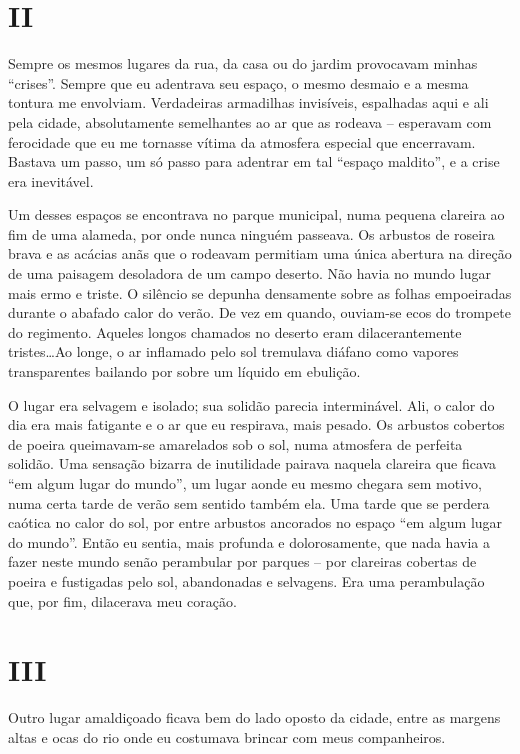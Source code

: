 \chapter*{\centering\Large{II}}

Sempre os mesmos lugares da rua, da casa ou do jardim provocavam minhas ``crises''. Sempre que eu adentrava seu espaço, o mesmo desmaio e a mesma tontura me envolviam. Verdadeiras armadilhas invisíveis, espalhadas aqui e ali pela cidade, absolutamente semelhantes ao ar que as rodeava -- esperavam com ferocidade que eu me tornasse vítima da atmosfera especial que encerravam. Bastava um passo, um só passo para adentrar em tal ``espaço maldito'', e a crise era inevitável.

Um desses espaços se encontrava no parque municipal, numa pequena clareira ao fim de uma alameda, por onde nunca ninguém passeava. Os arbustos de roseira brava e as acácias anãs que o rodeavam permitiam uma única abertura na direção de uma paisagem desoladora de um campo deserto. Não havia no mundo lugar mais ermo e triste. O silêncio se depunha densamente sobre as folhas empoeiradas durante o abafado calor do verão. De vez em quando, ouviam-se ecos do trompete do regimento. Aqueles longos chamados no deserto eram dilacerantemente tristes\dots Ao longe, o ar inflamado pelo sol tremulava diáfano como vapores transparentes bailando por sobre um líquido em ebulição.

O lugar era selvagem e isolado; sua solidão parecia interminável. Ali, o calor do dia era mais fatigante e o ar que eu respirava, mais pesado. Os arbustos cobertos de poeira queimavam-se amarelados sob o sol, numa atmosfera de perfeita solidão. Uma sensação bizarra de inutilidade pairava naquela clareira que ficava ``em algum lugar do mundo'', um lugar aonde eu mesmo chegara sem motivo, numa certa tarde de verão sem sentido também ela. Uma tarde que se perdera caótica no calor do sol, por entre arbustos ancorados no espaço ``em algum lugar do mundo''. Então eu sentia, mais profunda e dolorosamente, que nada havia a fazer neste mundo senão perambular por parques -- por clareiras cobertas de poeira e fustigadas pelo sol, abandonadas e selvagens. Era uma perambulação que, por fim, dilacerava meu coração.


\chapter*{\centering\Large{III}}

Outro lugar amaldiçoado ficava bem do lado oposto da cidade, entre as margens altas e ocas do rio onde eu costumava brincar com meus companheiros.

